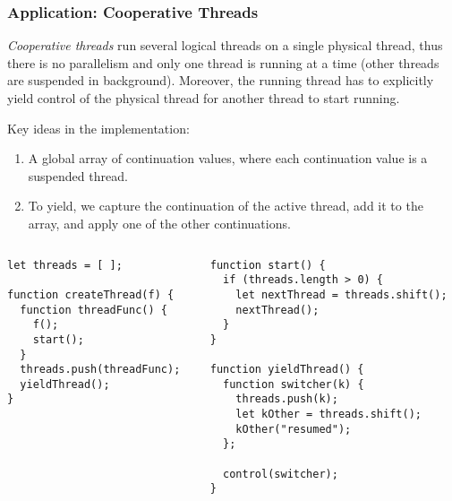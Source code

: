 \documentclass[8pt,pdf]{beamer}
\begin{document}
\begin{frame}[fragile]
\frametitle{Application: Cooperative Threads}

\begin{definition} \emph{Cooperative threads} run several logical threads on a
single physical thread, thus there is no parallelism and only one thread is
running at a time (other threads are suspended in background). Moreover, the
running thread has to explicitly yield control of the physical thread for
another thread to start running.
\end{definition}

\pause

Key ideas in the implementation:

\begin{enumerate}

  \item A global array of continuation values, where each continuation value is
  a suspended thread.

  \item To yield, we capture the continuation of the active thread, add it to
  the array, and apply one of the other continuations.

\end{enumerate}

\pause

\begin{columns}

\begin{column}{0.4\textwidth}
\begin{lstlisting}
let threads = [ ];

function createThread(f) {
  function threadFunc() {
    f();
    start();
  }
  threads.push(threadFunc);
  yieldThread();
}
\end{lstlisting}
\end{column}

\begin{column}{0.55\textwidth}
\begin{lstlisting}
function start() {
  if (threads.length > 0) {
    let nextThread = threads.shift();
    nextThread();
  }
}

function yieldThread() {
  function switcher(k) {
    threads.push(k);
    let kOther = threads.shift();
    kOther("resumed");
  };

  control(switcher);
}
\end{lstlisting}
\end{column}

\end{columns}

\end{frame}
\end{document}
